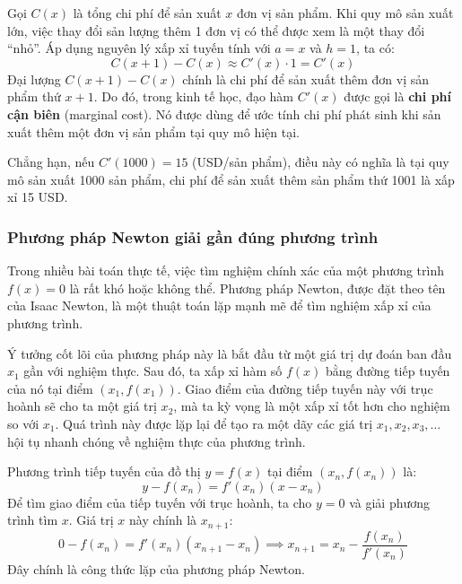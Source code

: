 \begin{example}
Gọi $C(x)$ là tổng chi phí để sản xuất $x$ đơn vị sản phẩm. Khi quy mô sản xuất lớn, việc thay đổi sản lượng thêm 1 đơn vị có thể được xem là một thay đổi ``nhỏ''. Áp dụng nguyên lý xấp xỉ tuyến tính với $a=x$ và $h=1$, ta có:
$$ C(x+1) - C(x) \approx C'(x) \cdot 1 = C'(x) $$
Đại lượng $C(x+1) - C(x)$ chính là chi phí để sản xuất thêm đơn vị sản phẩm thứ $x+1$. Do đó, trong kinh tế học, đạo hàm $C'(x)$ được gọi là \textbf{chi phí cận biên} (marginal cost). Nó được dùng để ước tính chi phí phát sinh khi sản xuất thêm một đơn vị sản phẩm tại quy mô hiện tại.

Chẳng hạn, nếu $C'(1000) = 15$ (USD/sản phẩm), điều này có nghĩa là tại quy mô sản xuất 1000 sản phẩm, chi phí để sản xuất thêm sản phẩm thứ 1001 là xấp xỉ 15 USD.
\end{example}

\subsubsection{Phương pháp Newton giải gần đúng phương trình}
\label{subsubsec:newton-method}

Trong nhiều bài toán thực tế, việc tìm nghiệm chính xác của một phương trình $f(x)=0$ là rất khó hoặc không thể. Phương pháp Newton, được đặt theo tên của Isaac Newton, là một thuật toán lặp mạnh mẽ để tìm nghiệm xấp xỉ của phương trình.

Ý tưởng cốt lõi của phương pháp này là bắt đầu từ một giá trị dự đoán ban đầu $x_1$ gần với nghiệm thực. Sau đó, ta xấp xỉ hàm số $f(x)$ bằng đường tiếp tuyến của nó tại điểm $(x_1, f(x_1))$. Giao điểm của đường tiếp tuyến này với trục hoành sẽ cho ta một giá trị $x_2$, mà ta kỳ vọng là một xấp xỉ tốt hơn cho nghiệm so với $x_1$. Quá trình này được lặp lại để tạo ra một dãy các giá trị $x_1, x_2, x_3, \dots$ hội tụ nhanh chóng về nghiệm thực của phương trình.

Phương trình tiếp tuyến của đồ thị $y=f(x)$ tại điểm $(x_n, f(x_n))$ là:
$$ y - f(x_n) = f'(x_n)(x - x_n) $$
Để tìm giao điểm của tiếp tuyến với trục hoành, ta cho $y=0$ và giải phương trình tìm $x$. Giá trị $x$ này chính là $x_{n+1}$:
$$ 0 - f(x_n) = f'(x_n)(x_{n+1} - x_n) \implies x_{n+1} = x_n - \dfrac{f(x_n)}{f'(x_n)} $$
Đây chính là công thức lặp của phương pháp Newton.

    
